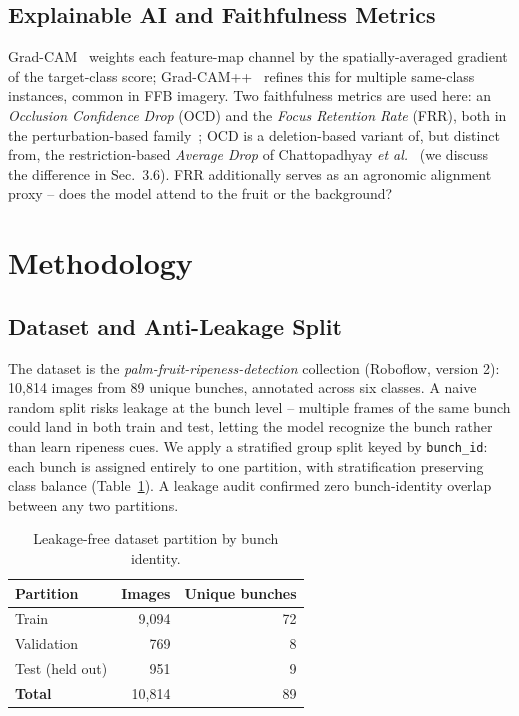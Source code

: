 \documentclass[twocolumn,a4paper,10pt]{article}
\begin{document}
\subsection{Explainable AI and Faithfulness Metrics}
Grad-CAM~\cite{gradcam} weights each feature-map channel by the
spatially-averaged gradient of the target-class score; Grad-CAM++~\cite{gradcampp}
refines this for multiple same-class instances, common in FFB imagery. Two
faithfulness metrics are used here: an \emph{Occlusion Confidence Drop} (OCD)
and the \emph{Focus Retention Rate} (FRR), both in the perturbation-based
family~\cite{rise}; OCD is a deletion-based variant of, but distinct from, the
restriction-based \emph{Average Drop} of Chattopadhyay \emph{et
al.}~\cite{gradcampp} (we discuss the difference in Sec.~3.6). FRR
additionally serves as an agronomic alignment proxy -- does the model attend
to the fruit or the background?

\section{Methodology}

\subsection{Dataset and Anti-Leakage Split}
The dataset is the \emph{palm-fruit-ripeness-detection} collection (Roboflow,
version 2): 10,814 images from 89 unique bunches, annotated across six classes.
A naive random split risks leakage at the bunch level -- multiple frames of the
same bunch could land in both train and test, letting the model recognize the
bunch rather than learn ripeness cues. We apply a stratified group split keyed
by \texttt{bunch\_id}: each bunch is assigned entirely to one partition, with
stratification preserving class balance (Table~\ref{tab:split}). A leakage audit
confirmed zero bunch-identity overlap between any two partitions.

\begin{table}[ht]
\centering
\caption{Leakage-free dataset partition by bunch identity.}
\label{tab:split}
\small
\begin{tabular}{lrr}
\toprule
\textbf{Partition} & \textbf{Images} & \textbf{Unique bunches} \\
\midrule
Train           & 9{,}094  & 72 \\
Validation      & 769      & 8 \\
Test (held out) & 951      & 9 \\
\midrule
\textbf{Total}  & 10{,}814 & 89 \\
\bottomrule
\end{tabular}
\end{table}
\end{document}
